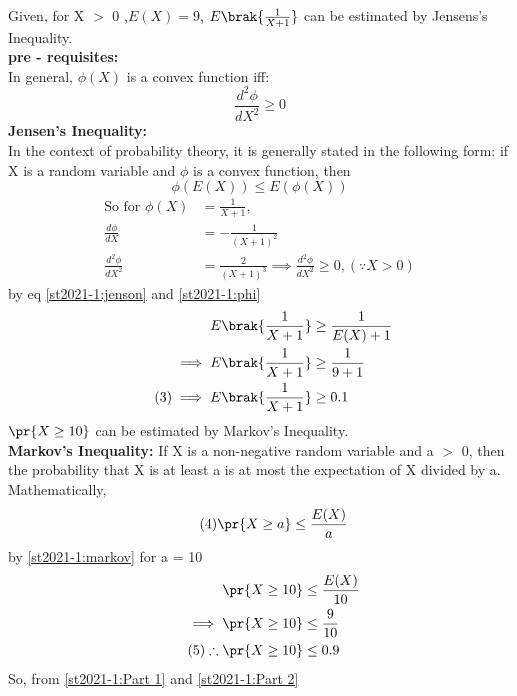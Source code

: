 
Given, for X $>$ 0 ,$E(X) = 9$, $E\brak{\frac{1}{X+1}}$ can be estimated by Jensens's Inequality. \\
\textbf{pre - requisites:}\\
In general, $\phi(X)$ is a convex function iff:
\begin{equation*}
    \frac{d^2 \phi}{dX^2} \ge 0
\end{equation*}
\textbf{Jensen's Inequality:}\\
In the context of probability theory, it is generally stated in the following form: if X is a random variable and $\phi$ is a convex function, then
\begin{equation*}
\tag{1} \label{st2021-1:jenson}
    \phi(E(X)) \le E(\phi(X))
\end{equation*}
\begin{align*}
    \text{So for } \phi(X) &= \frac{1}{X+1}, \\
                \frac{d\phi}{dX} &= - \frac{1}{(X+1)^{2}} \\
                \tag{2} \label{st2021-1:phi}
                \frac{d^2 \phi}{dX^2} &= \frac{2}{(X+1)^{3}} 
    \implies \frac{d^2 \phi}{dX^2} \ge 0,(\because X>0 )
\end{align*}
by eq \eqref{st2021-1:jenson} and \eqref{st2021-1:phi}
\begin{align*}
    E\brak{\frac{1}{X+1}} &\ge \frac{1}{E(X)+1} \\
    \implies E\brak{\frac{1}{X+1}} &\ge \frac{1}{9 + 1} \\
    \tag{3} \label{st2021-1:Part 1}
    \implies E\brak{\frac{1}{X+1}} &\ge 0.1
\end{align*}
$\pr{X \ge 10}$ can be estimated by Markov's Inequality.\\
\textbf{Markov's Inequality:}
If X is a non-negative random variable and a $>$ 0, then the probability that X is at least a is at most the expectation of X divided by a. \\
Mathematically,
\begin{equation*}
    \tag{4} \label{st2021-1:markov}
    \pr{X \ge a} \le \frac{E(X)}{a}
\end{equation*}
by \eqref{st2021-1:markov} for a = 10
\begin{align*}
    \pr{X \ge 10} &\le \frac{E(X)}{10} \\
    \implies \pr{X \ge 10} &\le \frac{9}{10} \\
    \tag{5} \label{st2021-1:Part 2}
   \therefore \pr{X \ge 10} &\le 0.9
\end{align*}
So, from \eqref{st2021-1:Part 1} and \eqref{st2021-1:Part 2} \\
\begin{center}
\end{center}
